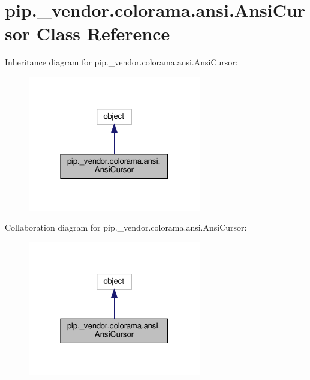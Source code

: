 \hypertarget{classpip_1_1__vendor_1_1colorama_1_1ansi_1_1AnsiCursor}{}\section{pip.\+\_\+vendor.\+colorama.\+ansi.\+Ansi\+Cursor Class Reference}
\label{classpip_1_1__vendor_1_1colorama_1_1ansi_1_1AnsiCursor}


Inheritance diagram for pip.\+\_\+vendor.\+colorama.\+ansi.\+Ansi\+Cursor\+:
\nopagebreak
\begin{figure}[H]
\begin{center}
\leavevmode
\includegraphics[width=214pt]{classpip_1_1__vendor_1_1colorama_1_1ansi_1_1AnsiCursor__inherit__graph}
\end{center}
\end{figure}


Collaboration diagram for pip.\+\_\+vendor.\+colorama.\+ansi.\+Ansi\+Cursor\+:
\nopagebreak
\begin{figure}[H]
\begin{center}
\leavevmode
\includegraphics[width=214pt]{classpip_1_1__vendor_1_1colorama_1_1ansi_1_1AnsiCursor__coll__graph}
\end{center}
\end{figure}
